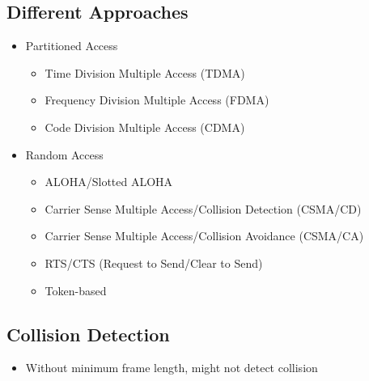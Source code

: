 \subsection{Different Approaches}
\begin{itemize}[nosep]
    \item Partitioned Access
          \begin{itemize}[nosep]
              \item Time Division Multiple Access (TDMA)
              \item Frequency Division Multiple Access (FDMA)
              \item Code Division Multiple Access (CDMA)
          \end{itemize}
    \item Random Access
          \begin{itemize}[nosep]
              \item ALOHA/Slotted ALOHA
              \item Carrier Sense Multiple Access/Collision Detection (CSMA/CD)
              \item Carrier Sense Multiple Access/Collision Avoidance (CSMA/CA)
              \item RTS/CTS (Request to Send/Clear to Send)
              \item Token-based
          \end{itemize}
\end{itemize}

\subsection{Collision Detection}
\begin{itemize}[nosep]
    \item Without minimum frame length, might not detect collision
\end{itemize}
